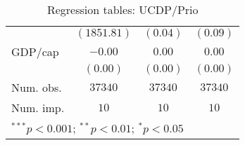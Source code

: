 \begin{table}
\begin{center}
\begin{tabular}{l c c c}
                           & $(1851.81)$   & $(0.04)$      & $(0.09)$     \\
GDP/cap                    & $-0.00$       & $0.00$        & $0.00$       \\
                           & $(0.00)$      & $(0.00)$      & $(0.00)$     \\
\midrule
Num. obs.                  & $37340$       & $37340$       & $37340$      \\
Num. imp.                  & $10$          & $10$          & $10$         \\
\bottomrule
\multicolumn{4}{l}{\scriptsize{$^{***}p<0.001$; $^{**}p<0.01$; $^{*}p<0.05$}}
\end{tabular}
\caption{Regression tables: UCDP/Prio}
\label{UCDPreg}
\end{center}
\end{table}
